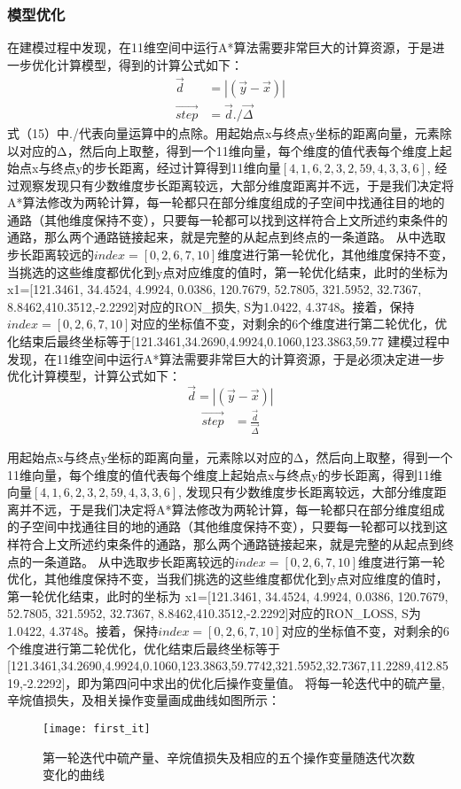 \documentclass[bwprint]{gmcmthesis}
\begin{document}
\subsubsection{模型优化}
在建模过程中发现，在11维空间中运行A*算法需要非常巨大的计算资源，于是进一步优化计算模型，得到的计算公式如下：
\begin{align}
\vec{d }&=\left | \left ( \vec{y}-\vec{x} \right ) \right |\\
\overrightarrow{step }&= \vec{d }./{\overrightarrow{\Delta} }
\end{align}
式（15）中./代表向量运算中的点除。用起始点x与终点y坐标的距离向量，元素除以对应的Δ，然后向上取整，得到一个11维向量，每个维度的值代表每个维度上起始点x与终点y的步长距离，经过计算得到11维向量\:$[4, 1, 6, 2, 3, 2, 59, 4, 3, 3, 6]$,
经过观察发现只有少数维度步长距离较远，大部分维度距离并不远，于是我们决定将A*算法修改为两轮计算，每一轮都只在部分维度组成的子空间中找通往目的地的通路（其他维度保持不变），只要每一轮都可以找到这样符合上文所述约束条件的通路，那么两个通路链接起来，就是完整的从起点到终点的一条道路。
从中选取步长距离较远的$index=[0,2,6,7,10]$维度进行第一轮优化，其他维度保持不变，当挑选的这些维度都优化到y点对应维度的值时，第一轮优化结束，此时的坐标为
x1=[121.3461, 34.4524, 4.9924, 0.0386, 120.7679, 52.7805, 321.5952, 32.7367, 8.8462,410.3512,-2.2292]对应的RON\_损失,  S为1.0422, 4.3748。接着，保持$index=[0,2,6,7,10]$对应的坐标值不变，对剩余的6个维度进行第二轮优化，优化结束后最终坐标等于[121.3461,34.2690,4.9924,0.1060,123.3863,59.77
建模过程中发现，在11维空间中运行A*算法需要非常巨大的计算资源，于是必须决定进一步优化计算模型，计算公式如下：
\begin{equation}
	\overrightarrow{d}= \left | \left ( \overrightarrow{y}-\overrightarrow{x}\right ) \right |
\end{equation}
\begin{align}
	\overrightarrow{step} & = \frac{\vec{d }}{\overrightarrow{\Delta} }  
\end{align}

用起始点x与终点y坐标的距离向量，元素除以对应的Δ，然后向上取整，得到一个11维向量，每个维度的值代表每个维度上起始点x与终点y的步长距离，得到11维向量\:$[4, 1, 6, 2, 3, 2, 59, 4, 3, 3, 6]$,
发现只有少数维度步长距离较远，大部分维度距离并不远，于是我们决定将A*算法修改为两轮计算，每一轮都只在部分维度组成的子空间中找通往目的地的通路（其他维度保持不变），只要每一轮都可以找到这样符合上文所述约束条件的通路，那么两个通路链接起来，就是完整的从起点到终点的一条道路。
从中选取步长距离较远的$index=[0,2,6,7,10]$维度进行第一轮优化，其他维度保持不变，当我们挑选的这些维度都优化到y点对应维度的值时，第一轮优化结束，此时的坐标为
x1=[121.3461, 34.4524, 4.9924, 0.0386, 120.7679, 52.7805, 321.5952, 32.7367, 8.8462,410.3512,-2.2292]对应的RON\_LOSS,  S为1.0422, 4.3748。接着，保持$index=[0,2,6,7,10]$对应的坐标值不变，对剩余的6个维度进行第二轮优化，优化结束后最终坐标等于[121.3461,34.2690,4.9924,0.1060,123.3863,59.7742,321.5952,32.7367,11.2289,412.8519,-2.2292]，即为第四问中求出的优化后操作变量值。
将每一轮迭代中的硫产量,辛烷值损失，及相关操作变量画成曲线如图所示：
\begin{figure}[htb]
	\centering
	\texttt{[image: first\_it]}
	\caption{第一轮迭代中硫产量、辛烷值损失及相应的五个操作变量随迭代次数变化的曲线}
\end{figure}
\end{document}

